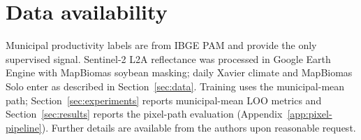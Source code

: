 \section*{Data availability}
Municipal productivity labels are from IBGE PAM and provide the only supervised signal.
Sentinel-2 L2A reflectance was processed in Google Earth Engine with MapBiomas soybean masking; daily Xavier climate and MapBiomas Solo enter as described in Section~\ref{sec:data}.
Training uses the municipal-mean path; Section~\ref{sec:experiments} reports municipal-mean LOO metrics and Section~\ref{sec:results} reports the pixel-path evaluation (Appendix~\ref{app:pixel-pipeline}).
Further details are available from the authors upon reasonable request.
